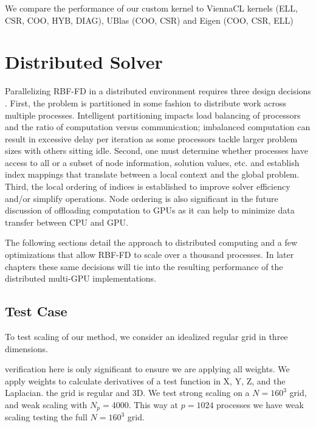 \documentclass{report}
\begin{document}
We compare the performance of our custom kernel to ViennaCL kernels (ELL, CSR, COO, HYB, DIAG), UBlas (COO, CSR) and Eigen (COO, CSR, ELL)



\chapter{Distributed Solver}
\label{chap:distributed_rbffd}

Parallelizing RBF-FD in a distributed environment requires three
design decisions \cite{Saad2003}. First, the problem is partitioned in some fashion to distribute work across multiple processes. Intelligent partitioning
impacts load balancing of processors and the ratio of computation versus communication; imbalanced computation can result in excessive delay per
iteration as some processors tackle larger problem sizes with others sitting idle. Second, one must determine whether processes have access to all or a subset of node information,
solution values, etc. and establish index mappings that translate between a local context and the global problem. Third, the local ordering of indices is established to improve solver efficiency and/or simplify operations. Node
ordering is also significant in the future discussion of offloading computation to GPUs as it can help to minimize data transfer between CPU and GPU. 

The following sections detail the approach to distributed computing and a few optimizations that allow RBF-FD to scale over a thousand processes. In later chapters these same decisions will tie into the resulting performance of the distributed multi-GPU implementations. 

\section{Test Case}

To test scaling of our method, we consider an idealized regular grid in three dimensions. 

verification here is only significant to ensure we are applying all weights. 
We apply weights to calculate derivatives of a test function in X, Y, Z, and the Laplacian. 
the grid is regular and 3D.
We test strong scaling on a $N=160^3$ grid, and weak scaling with $N_p=4000$. This way at $p=1024$ processes we have weak scaling testing the full $N=160^3$ grid. 
\end{document}
